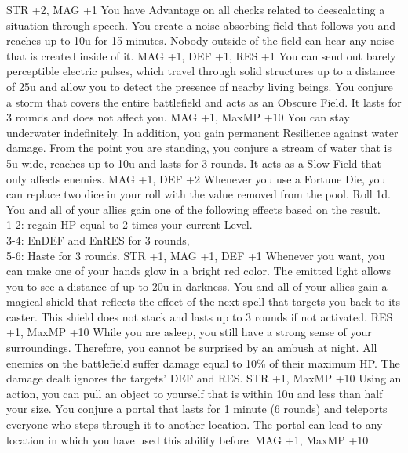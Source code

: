 {STR +2, MAG +1}
%
\vfill
%
{You have Advantage on all checks related to deescalating a situation through speech.}
{You create a noise-absorbing field that follows you and reaches up to 10u for 15 minutes. Nobody outside of the field can hear any noise that is created inside of it.}
{MAG +1, DEF +1, RES +1}
%
\clearpage
%
{You can send out barely perceptible electric pulses, which travel through solid structures up to a distance of 25u and allow you to detect the presence of nearby living beings.}
{You conjure a storm  that covers the entire battlefield and acts as an Obscure Field. It lasts for 3 rounds and does not affect you.}
{MAG +1, MaxMP +10}
%
\vfill
%
{You can stay underwater indefinitely. In addition, you gain permanent Resilience against water damage.}
{From the point you are standing, you conjure a stream of water that is 5u wide, reaches up to 10u and lasts for 3 rounds. It acts as a Slow Field that only affects enemies.}
{MAG +1, DEF +2}
%
\vfill
%
{Whenever you use a Fortune Die, you can replace two dice in your roll with the value removed from the pool.}
{Roll 1d. You and all of your allies gain one of the following effects based on the result.\\ 1-2: regain HP equal to 2 times your current Level.\\ 3-4: EnDEF and EnRES for 3 rounds,\\ 5-6: Haste for 3 rounds.}
{STR +1, MAG +1, DEF +1}
%
\newpage
%
{Whenever you want, you can make one of your hands glow in a bright red color. The emitted light allows you to see a distance of up to 20u in darkness.}
{You and all of your allies gain a magical shield that reflects the effect of the next spell that targets you back to its caster. This shield does not stack and lasts up to 3 rounds if not activated.}
{RES +1, MaxMP +10}
%
\vfill
%
{While you are asleep, you still have a strong sense of your surroundings. Therefore, you cannot be surprised by an ambush at night.}
{All enemies on the battlefield suffer damage equal to 10\% of their maximum HP. The damage dealt ignores the targets' DEF and RES.}
{STR +1, MaxMP +10}
%
\vfill
%
{Using an action, you can pull an object to yourself that is within 10u and less than half your size.}
{You conjure a portal that lasts for 1 minute (6 rounds) and teleports everyone who steps through it to another location. The portal can lead to any location in which you have used this ability before.}
{MAG +1, MaxMP +10}
%
\clearpage